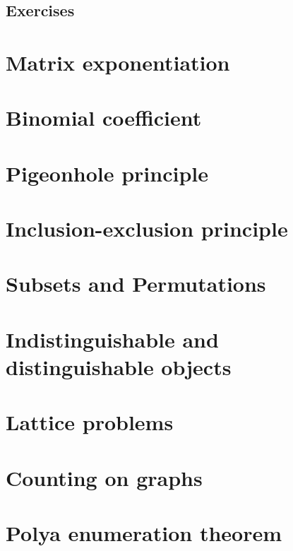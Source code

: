 \subsection{Exercises}

\section{Matrix exponentiation}

\section{Binomial coefficient}

\section{Pigeonhole principle}

\section{Inclusion-exclusion principle}

\section{Subsets and Permutations}

\section{Indistinguishable and distinguishable objects}

\section{Lattice problems}

\section{Counting on graphs}

\section{Polya enumeration theorem}
